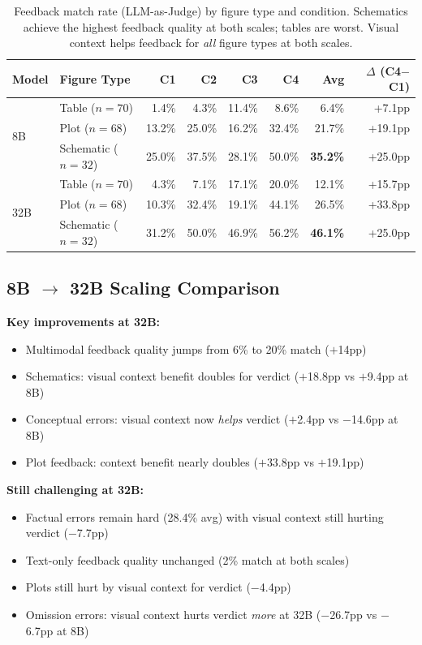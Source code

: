 \documentclass{article} %
\begin{document}
\begin{table}[h]
\centering
\small
\begin{tabular}{@{}llrrrrrr@{}}
\toprule
Model & Figure Type & C1 & C2 & C3 & C4 & Avg & $\Delta$ (C4$-$C1) \\
\midrule
\multirow{3}{*}{8B} & Table ($n{=}70$) & 1.4\% & 4.3\% & 11.4\% & 8.6\% & 6.4\% & +7.1pp \\
 & Plot ($n{=}68$) & 13.2\% & 25.0\% & 16.2\% & 32.4\% & 21.7\% & +19.1pp \\
 & Schematic ($n{=}32$) & 25.0\% & 37.5\% & 28.1\% & 50.0\% & \textbf{35.2\%} & +25.0pp \\
\midrule
\multirow{3}{*}{32B} & Table ($n{=}70$) & 4.3\% & 7.1\% & 17.1\% & 20.0\% & 12.1\% & +15.7pp \\
 & Plot ($n{=}68$) & 10.3\% & 32.4\% & 19.1\% & 44.1\% & 26.5\% & +33.8pp \\
 & Schematic ($n{=}32$) & 31.2\% & 50.0\% & 46.9\% & 56.2\% & \textbf{46.1\%} & +25.0pp \\
\bottomrule
\end{tabular}
\caption{Feedback match rate (LLM-as-Judge) by figure type and condition. Schematics achieve the highest feedback quality at both scales; tables are worst. Visual context helps feedback for \textit{all} figure types at both scales.}
\label{tab:h4_feedback}
\end{table}

\subsection{8B $\rightarrow$ 32B Scaling Comparison}

\noindent\textbf{Key improvements at 32B:}
\begin{itemize}[itemsep=1pt, topsep=2pt, leftmargin=*]
  \item Multimodal feedback quality jumps from 6\% to 20\% match ($+$14pp)
  \item Schematics: visual context benefit doubles for verdict ($+$18.8pp vs $+$9.4pp at 8B)
  \item Conceptual errors: visual context now \textit{helps} verdict ($+$2.4pp vs $-$14.6pp at 8B)
  \item Plot feedback: context benefit nearly doubles ($+$33.8pp vs $+$19.1pp)
\end{itemize}

\noindent\textbf{Still challenging at 32B:}
\begin{itemize}[itemsep=1pt, topsep=2pt, leftmargin=*]
  \item Factual errors remain hard (28.4\% avg) with visual context still hurting verdict ($-$7.7pp)
  \item Text-only feedback quality unchanged (2\% match at both scales)
  \item Plots still hurt by visual context for verdict ($-$4.4pp)
  \item Omission errors: visual context hurts verdict \textit{more} at 32B ($-$26.7pp vs $-$6.7pp at 8B)
\end{itemize}
\end{document}
